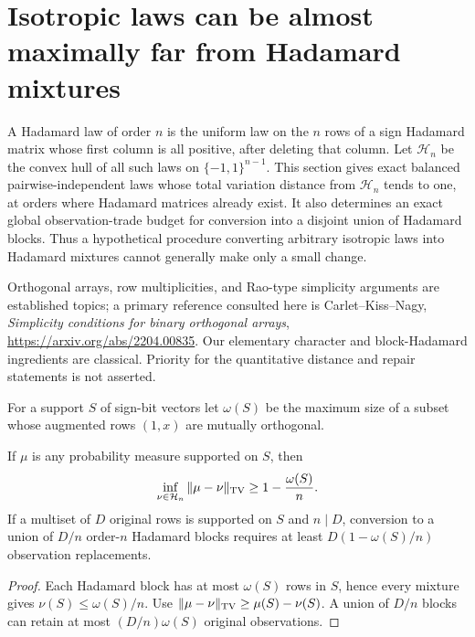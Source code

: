 \section{Isotropic laws can be almost maximally far from Hadamard mixtures}
\label{sec:design-hadamard-distance}
A Hadamard law of order $n$ is the uniform law on the $n$ rows of a
sign Hadamard matrix whose first column is all positive, after deleting
that column. Let $\mathcal H_n$ be the convex hull of all such laws on
$\{-1,1\}^{n-1}$. This section gives exact balanced pairwise-independent
laws whose total variation distance from $\mathcal H_n$ tends to one,
at orders where Hadamard matrices already exist. It also determines
an exact global observation-trade budget for conversion into a disjoint
union of Hadamard blocks. Thus a hypothetical procedure converting
arbitrary isotropic laws into Hadamard mixtures cannot generally make
only a small change.

Orthogonal arrays, row multiplicities, and Rao-type simplicity arguments
are established topics; a primary reference consulted here is
Carlet--Kiss--Nagy, \emph{Simplicity conditions for binary orthogonal arrays},
\url{https://arxiv.org/abs/2204.00835}. Our elementary character and
block-Hadamard ingredients are classical. Priority for the quantitative
distance and repair statements is not asserted.

For a support $S$ of sign-bit vectors let $\omega(S)$ be the maximum
size of a subset whose augmented rows $(1,x)$ are mutually orthogonal.
\begin{lemma}
\label{lem:design-support-witness}
If $\mu$ is any probability measure supported on $S$, then
\[
 \inf_{\nu\in\mathcal H_n}\|\mu-\nu\|_{\rm TV}
 \ge1-\frac{\omega(S)}n.
\]
If a multiset of $D$ original rows is supported on $S$ and $n\mid D$,
conversion to a union of $D/n$ order-$n$ Hadamard blocks requires at
least $D(1-\omega(S)/n)$ observation replacements.
\end{lemma}
\begin{proof}
Each Hadamard block has at most $\omega(S)$ rows in $S$, hence every
mixture gives $\nu(S)\le\omega(S)/n$. Use
$\|\mu-\nu\|_{\rm TV}\ge\mu(S)-\nu(S)$. A union of $D/n$ blocks
can retain at most $(D/n)\omega(S)$ original observations.
\end{proof}

